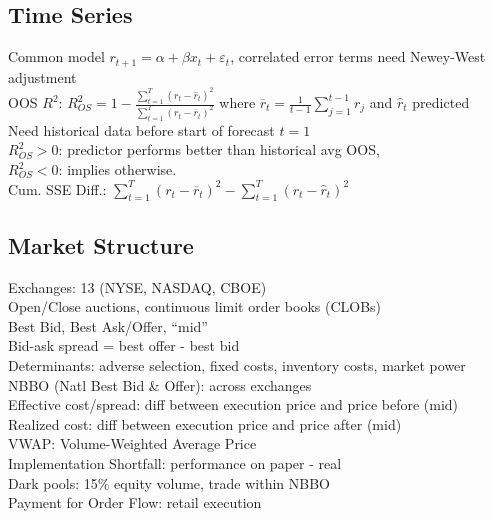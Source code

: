 	\subsection*{Time Series}
	Common model $r_{t+1} = \alpha + \beta x_{t} + \varepsilon_{t}$, correlated error terms need Newey-West adjustment\\
	OOS $R^{2}$: $R^{2}_{OS} = 1 - \frac{\sum_{t=1}^{T}\left(r_{t} - \hat{r}_{t}\right)^{2}}{\sum_{t=1}^{T}\left(r_{t} - \overline{r}_{t}\right)^{2}}$ where $\overline{r}_{t} = \frac{1}{t-1}\sum_{j=1}^{t-1}r_{j}$ and $\hat{r}_{t}$ predicted\\
	Need historical data before start of forecast $t = 1$\\
	$R^{2}_{OS} > 0$: predictor performs better than historical avg OOS,\\
	$R^{2}_{OS} < 0$: implies otherwise.\\
	Cum. SSE Diff.: $\sum_{t=1}^{T}\left(r_{t} - \overline{r}_{t}\right)^{2} - \sum_{t=1}^{T}\left(r_{t} - \hat{r}_{t}\right)^{2}$
	
	\subsection*{Market Structure}
	Exchanges: 13 (NYSE, NASDAQ, CBOE)\\
	Open/Close auctions, continuous limit order books (CLOBs)\\
	Best Bid, Best Ask/Offer, ``mid''\\
	Bid-ask spread = best offer - best bid\\
	Determinants: adverse selection, fixed costs, inventory costs, market power\\
	NBBO (Natl Best Bid \& Offer): across exchanges\\
	Effective cost/spread: diff between execution price and price before (mid)\\
	Realized cost: diff between execution price and price after (mid)\\
	VWAP: Volume-Weighted Average Price\\
	Implementation Shortfall: performance on paper - real\\
	Dark pools: 15\% equity volume, trade within NBBO\\
	Payment for Order Flow: retail execution
